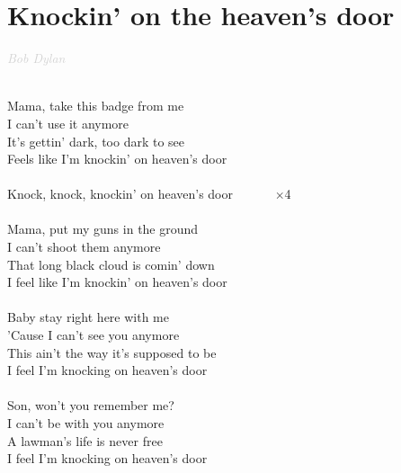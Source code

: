 \documentclass[a5paper, 10pt]{book}
\begin{document}
 
 
 \newpage
\section{Knockin' on the heaven's door}\textcolor{lightgray}{\textit{Bob Dylan}}\\~\\
\begin{minipage}[t]{0.7\textwidth}
Mama, take this badge from me				\\
I can't use it anymore		\\
It's gettin' dark, too dark to see\\
Feels like I'm knockin' on heaven's door\\
\\
\hspace*{5mm}Knock, knock, knockin' on heaven's door ~~~~~~$\times$4\\
\\
Mama, put my guns in the ground\\
I can't shoot them anymore\\
That long black cloud is comin' down\\
I feel like I'm knockin' on heaven's door\\
\\
Baby stay right here with me\\
'Cause I can't see you anymore\\
This ain't the way it's supposed to be\\
I feel I'm knocking on heaven's door\\
\\
Son, won't you remember me?\\
I can't be with you anymore\\
A lawman's life is never free\\
I feel I'm knocking on heaven's door\\
\end{minipage}
\end{document}
